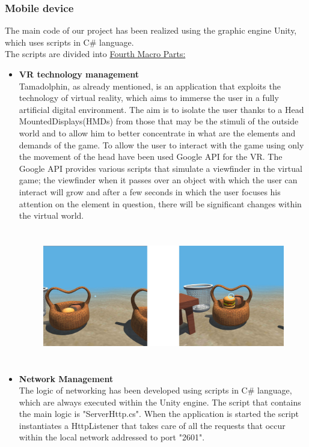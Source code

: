 \documentclass [12pt]{article}
\begin{document}
\subsubsection {Mobile device}
The main code of our project has been realized using the graphic engine Unity, which uses scripts in C\# language.\\
The scripts are divided into \underline{Fourth Macro Parts:}
\begin{itemize}[•]
\item \textbf{VR technology management}\\
Tamadolphin, as already mentioned, is an application that exploits the technology of virtual reality, which aims to immerse the user in a fully artificial digital environment.
The aim is to isolate the user thanks to a Head MountedDisplays(HMDs) from those that may be the stimuli of the outside world and to allow him to better concentrate in what are the elements and demands of the game.
To allow the user to interact with the game using only the movement of the head have been used Google API for the VR. The Google API provides various scripts that simulate a viewfinder in the virtual game; the viewfinder when it passes over an object with which the user can interact will grow and after a few seconds in which the user focuses his attention on the element in question, there will be significant changes within the virtual world.

\begin{figure}[ht!]
\centering
\includegraphics[height=5.8cm,width=16cm]{VrMirino.jpg}
\end{figure}
\clearpage

\item \textbf{Network Management}\\
The logic of networking has been developed using scripts in C\# language, which are always executed within the Unity engine.
The script that contains the main logic is "ServerHttp.cs". When the application is started the script instantiates a HttpListener that takes care of all the requests that occur within the local network addressed to port "2601". \\


\end{itemize}
\end{document}
